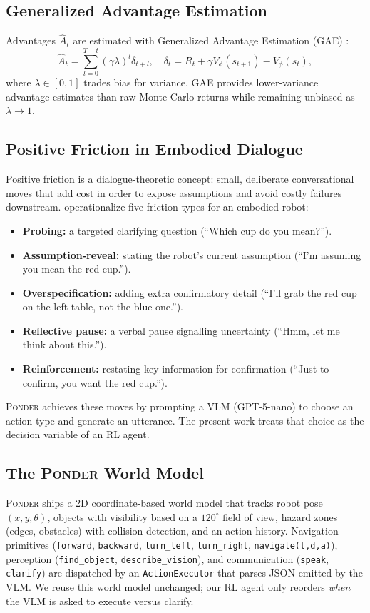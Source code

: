 \subsection{Generalized Advantage Estimation}
Advantages $\hat{A}_t$ are estimated with Generalized Advantage Estimation (GAE) \cite{schulman2016gae}:
\begin{equation}
    \hat{A}_t = \sum_{l=0}^{T-t} (\gamma \lambda)^l \delta_{t+l}, \quad \delta_t = R_t + \gamma V_\phi(s_{t+1}) - V_\phi(s_t),
\end{equation}
where $\lambda \in [0,1]$ trades bias for variance. GAE provides lower-variance advantage estimates than raw Monte-Carlo returns while remaining unbiased as $\lambda \to 1$.

\subsection{Positive Friction in Embodied Dialogue}
Positive friction \cite{inan2025betterslow} is a dialogue-theoretic concept: small, deliberate conversational moves that add cost in order to expose assumptions and avoid costly failures downstream. \citet{ponder2026} operationalize five friction types for an embodied robot:
\begin{itemize}
    \item \textbf{Probing:} a targeted clarifying question (``Which cup do you mean?'').
    \item \textbf{Assumption-reveal:} stating the robot's current assumption (``I'm assuming you mean the red cup.'').
    \item \textbf{Overspecification:} adding extra confirmatory detail (``I'll grab the red cup on the left table, not the blue one.'').
    \item \textbf{Reflective pause:} a verbal pause signalling uncertainty (``Hmm, let me think about this.'').
    \item \textbf{Reinforcement:} restating key information for confirmation (``Just to confirm, you want the red cup.'').
\end{itemize}
\textsc{Ponder} achieves these moves by prompting a VLM (GPT-5-nano) to choose an action type and generate an utterance. The present work treats that choice as the decision variable of an RL agent.

\subsection{The \textsc{Ponder} World Model}
\textsc{Ponder} ships a 2D coordinate-based world model that tracks robot pose $(x, y, \theta)$, objects with visibility based on a $120^\circ$ field of view, hazard zones (edges, obstacles) with collision detection, and an action history. Navigation primitives (\texttt{forward}, \texttt{backward}, \texttt{turn\_left}, \texttt{turn\_right}, \texttt{navigate(t,d,a)}), perception (\texttt{find\_object}, \texttt{describe\_vision}), and communication (\texttt{speak}, \texttt{clarify}) are dispatched by an \texttt{ActionExecutor} that parses JSON emitted by the VLM. We reuse this world model unchanged; our RL agent only reorders \emph{when} the VLM is asked to execute versus clarify.
